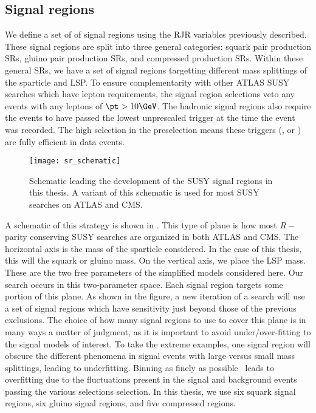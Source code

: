 

\subsection{Signal regions}
We define a set of of signal regions using the RJR variables previously described.
These signal regions are split into three general categories: squark pair production SRs, gluino pair production SRs, and compressed production SRs.
Within these general SRs, we have a set of signal regions targetting different mass splittings of the sparticle and LSP.
To ensure complementarity with other ATLAS SUSY searches which have lepton requirements, the signal region selections veto any events with any leptons of $\pt > 10 \GeV$.
The hadronic signal regions also require the events to have passed the lowest unprescaled \met trigger at the time the event was recorded.
The high \met selection in the preselection means these triggers (,  or ) are fully efficient in data events.
\begin{figure}[tbp]
\caption{Schematic leading the development of the SUSY signal regions in this thesis.
A variant of this schematic is used for most SUSY searches on ATLAS and CMS.
} \label{fig:sr_schematic}
\texttt{[image: sr\_schematic]}
\end{figure}

A schematic of this strategy is shown in .
This type of plane is how most $R-$parity conserving SUSY searches are organized in both ATLAS and CMS.
The horizontal axis is the mass of the sparticle considered.
In the case of this thesis, this will the squark or gluino mass.
On the vertical axis, we place the LSP mass.
These are the two free parameters of the simplified models considered here.
Our search occurs in this two-parameter space.
Each signal region targets some portion of this plane.
As shown in the figure, a new iteration of a search will use a set of signal regions which have sensitivity just beyond those of the previous exclusions.
The choice of how many signal regions to use to cover this plane is in many ways a matter of judgment, as it is important to avoid under/over-fitting to the signal models of interest.
To take the extreme examples, one signal region will obscure the different phenomena in signal events with large versus small mass splittings, leading to underfitting.
Binning as finely as possible\footnotemark~ leads to overfitting due to the fluctuations present in the signal and background events passing the various selections selection.
In this thesis, we use six squark signal regions, six gluino signal regions, and five compressed regions.

